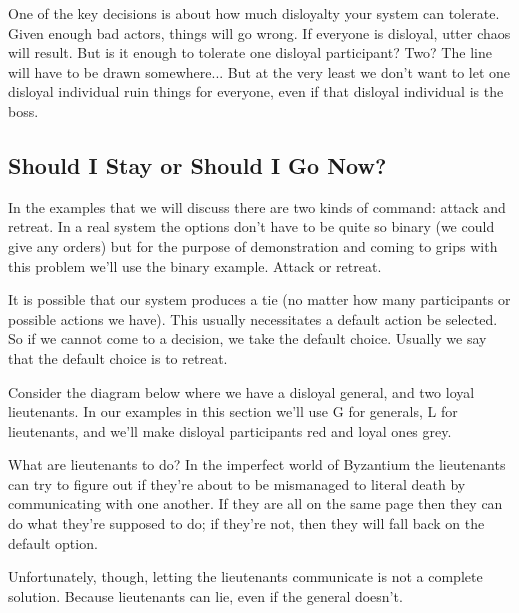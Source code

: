 \documentclass[a4paper]{report}
\begin{document}
One of the key decisions is about how much disloyalty your system can tolerate. Given enough bad actors, things will go wrong. If everyone is disloyal, utter chaos will result. But is it enough to tolerate one disloyal participant? Two? The line will have to be drawn somewhere... But at the very least we don't want to let one disloyal individual ruin things for everyone, even if that disloyal individual is the boss.

\subsection*{Should I Stay or Should I Go Now?}
In the examples that we will discuss there are two kinds of command: attack and retreat. In a real system the options don't have to be quite so binary (we could give any orders) but for the purpose of demonstration and coming to grips with this problem we'll use the binary example. Attack or retreat.

It is possible that our system produces a tie (no matter how many participants or possible actions we have). This usually necessitates a default action be selected. So if we cannot come to a decision, we take the default choice. Usually we say that the default choice is to retreat.

Consider the  diagram below where we have a disloyal general, and two loyal lieutenants. In our examples in this section we'll use G for generals, L for lieutenants, and we'll make disloyal participants red and loyal ones grey.

\begin{center}
\end{center}

What are lieutenants to do? In the imperfect world of Byzantium the lieutenants can try to figure out if they're about to be mismanaged to literal death by communicating with one another. If they are all on the same page then they can do what they're supposed to do; if they're not, then they will fall back on the default option.

Unfortunately, though, letting the lieutenants communicate is not a complete solution. Because lieutenants can lie, even if the general doesn't.
\end{document}

